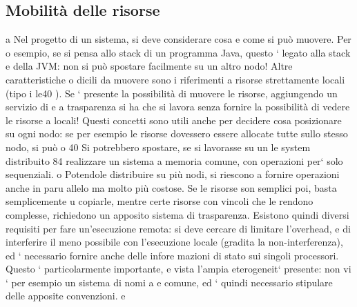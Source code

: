 \documentclass[a4paper,12pt]{article}
\begin{document}
\subsection{Mobilità delle risorse}
a
Nel progetto di un sistema, si deve considerare cosa e come si può muovere. Per
o
esempio, se si pensa allo stack di un programma Java, questo ` legato alla stack
e
della JVM: non si può spostare facilmente su un altro nodo! Altre caratteristiche
o
dicili da muovere sono i riferimenti a risorse strettamente locali (tipo i le40 ).
Se ` presente la possibilità di muovere le risorse, aggiungendo un servizio di
e
a
trasparenza si ha che si lavora senza fornire la possibilità di vedere le risorse
a
locali!
Questi concetti sono utili anche per decidere cosa posizionare su ogni nodo:
se per esempio le risorse dovessero essere allocate tutte sullo stesso nodo, si può
o
40 Si
potrebbero spostare, se si lavorasse su un le system distribuito
84
realizzare un sistema a memoria comune, con operazioni per` solo sequenziali.
o
Potendole distribuire su più nodi, si riescono a fornire operazioni anche in paru
allelo ma molto più costose. Se le risorse son semplici poi, basta semplicemente
u
copiarle, mentre certe risorse con vincoli che le rendono complesse, richiedono
un apposito sistema di trasparenza.
Esistono quindi diversi requisiti per fare un'esecuzione remota: si deve cercare di limitare l'overhead, e di
interferire il meno possibile con l'esecuzione
locale (gradita la non-interferenza), ed ` necessario fornire anche delle infore
mazioni di stato sui singoli processori. Questo ` particolarmente importante,
e
vista l'ampia eterogeneit` presente: non vi ` per esempio un sistema di nomi
a
e
comune, ed ` quindi necessario stipulare delle apposite convenzioni.
e
\end{document}
